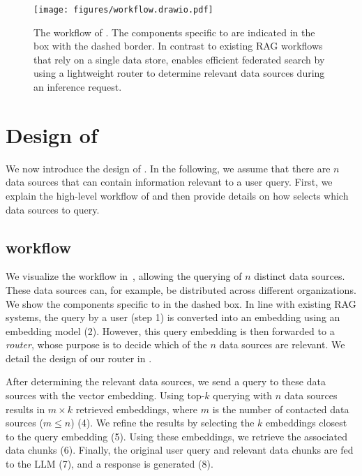 \begin{figure*}[th!]
    \centering
    \texttt{[image: figures/workflow.drawio.pdf]}
    \caption{The workflow of \sys. The components specific to \sys are indicated in the box with the dashed border. In contrast to existing \ac{RAG} workflows that rely on a single data store, \sys enables efficient federated search by using a lightweight router to determine relevant data sources during an inference request.
    }
    \label{fig:workflow}
\end{figure*}

\section{Design of \sys}
\label{sec:design}

We now introduce the design of \sys.
In the following, we assume that there are $ n $ data sources that can contain information relevant to a user query.
First, we explain the high-level workflow of \sys and then provide details on how \sys selects which data sources to query.

\subsection{\sys workflow}
We visualize the \sys workflow in~, allowing the querying of $ n $ distinct data sources.
These data sources can, for example, be distributed across different organizations.
We show the components specific to \sys in the dashed box.
In line with existing \ac{RAG} systems, the query by a user (step 1) is converted into an embedding using an embedding model (2).
However, this query embedding is then forwarded to a \emph{router}, whose purpose is to decide which of the $ n $ data sources are relevant.
We detail the design of our router in .

After determining the relevant data sources, we send a query to these data sources with the vector embedding.
Using top-$k$ querying with $ n $ data sources results in $ m \times k $ retrieved embeddings, where $ m $ is the number of contacted data sources ($ m \leq n $) (4).
We refine the results by selecting the $ k $ embeddings closest to the query embedding (5).
Using these embeddings, we retrieve the associated data chunks (6).
Finally, the original user query and relevant data chunks are fed to the \ac{LLM} (7), and a response is generated (8).

